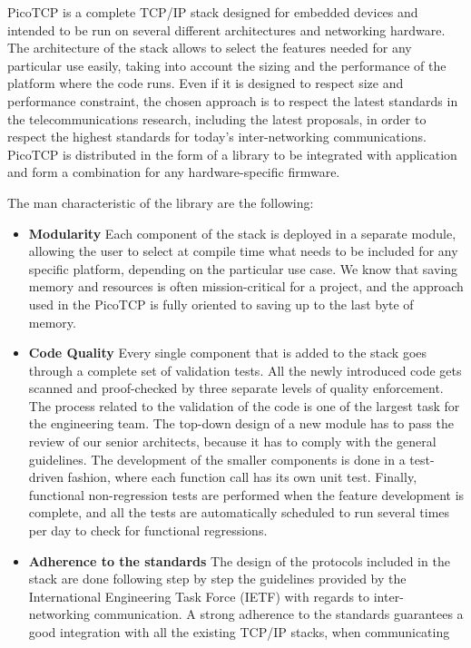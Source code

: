 PicoTCP is a complete TCP/IP stack designed for embedded devices and
intended to be run on several different architectures and networking
hardware. The architecture of the stack allows to select the features
needed for any particular use easily, taking into account the sizing and
the performance of the platform where the code runs. Even if it is designed
to respect size and performance constraint, the chosen approach is to
respect the latest standards in the telecommunications research, including
the latest proposals, in order to respect the highest standards for
today's inter-networking communications. PicoTCP is distributed in the form
of a library to be integrated with application and form a combination for
any hardware-specific firmware.


The man characteristic of the library are the following:
\begin{itemize}
\item \textbf{Modularity} Each component of the stack is deployed in a
separate module, allowing the user to select at compile time what needs to
be included for any specific platform, depending on the particular use case.
We know that saving memory and resources is often mission-critical for a
project, and the approach used in the PicoTCP is fully oriented to saving
up to the last byte of memory.
\item \textbf{Code Quality} Every single component that is added to the
stack goes through a complete set of validation tests. All the newly
introduced code gets scanned and proof-checked by three separate levels of
quality enforcement. The process related to the validation of the code is
one of the largest task for the engineering team. The top-down design of a
new module has to pass the review of our senior architects, because it has
to comply with the general guidelines. The development of the smaller
components is done in a test-driven fashion, where each function call has
its own unit test. Finally, functional non-regression tests are performed
when the feature development is complete, and all the tests are automatically
scheduled to run several times per day to check for functional regressions.
\item \textbf{Adherence to the standards} The design of the protocols
included in the stack are done following step by step the guidelines
provided by the International Engineering Task Force (IETF) with regards to
inter-networking communication. A strong adherence to the standards guarantees a
good integration with all the existing TCP/IP stacks, when communicating

\end{itemize}
